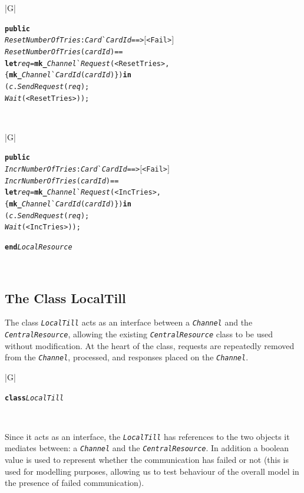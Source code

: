 \documentclass[\pformat,12pt,twoside]{article}
\newenvironment{VDMgray}%
{\begin{tabular}{|G|}\hline\small\begin{alltt}}%
{\end{alltt}\normalsize\\
 \hline\end{tabular}}
\begin{document}
\begin{VDMgray}
 \textbf{public}
 \textit{ResetNumberOfTries} : \textit{Card}\`{}\textit{CardId} ==\texttt{>} \ensuremath{[}\texttt{<}Fail\texttt{>}\ensuremath{]}
 \textit{ResetNumberOfTries}(\textit{cardId}) ==
   \textbf{let} \textit{req} = \textbf{mk\_}\textit{Channel}\`{}\textit{Request}(\texttt{<}ResetTries\texttt{>},
              \{\textbf{mk\_}\textit{Channel}\`{}\textit{CardId}(\textit{cardId})\}) \textbf{in}
     (\textit{c}.\textit{SendRequest}(\textit{req});
      \textit{Wait}(\texttt{<}ResetTries\texttt{>}));
\end{VDMgray}

\begin{VDMgray}
 \textbf{public}
 \textit{IncrNumberOfTries} : \textit{Card}\`{}\textit{CardId} ==\texttt{>} \ensuremath{[}\texttt{<}Fail\texttt{>}\ensuremath{]}
 \textit{IncrNumberOfTries}(\textit{cardId}) ==
   \textbf{let} \textit{req} = \textbf{mk\_}\textit{Channel}\`{}\textit{Request}(\texttt{<}IncTries\texttt{>},
                        \{\textbf{mk\_}\textit{Channel}\`{}\textit{CardId}(\textit{cardId})\}) \textbf{in}
     (\textit{c}.\textit{SendRequest}(\textit{req});
      \textit{Wait}(\texttt{<}IncTries\texttt{>}));

\textbf{end} \textit{LocalResource}
\end{VDMgray}


\subsection{The Class LocalTill}

The class \texttt{\emph{LocalTill}} acts as an interface between a
\texttt{\emph{Channel}} and the \texttt{\emph{CentralResource}},
allowing the existing \texttt{\emph{CentralResource}} class to be used
without modification. At the heart of the class, requests are
repeatedly removed from the \texttt{\emph{Channel}}, processed, and
responses placed on the \texttt{\emph{Channel}}.

\begin{VDMgray}
\textbf{class} \textit{LocalTill}
\end{VDMgray}


Since it acts as an interface, the \texttt{\emph{LocalTill}} has
references to the two objects it mediates between: a
\texttt{\emph{Channel}} and the \texttt{\emph{CentralResource}}.  In
addition a boolean value is used to represent whether the
communication has failed or not (this is used for modelling purposes,
allowing us to test behaviour of the overall model in the presence of
failed communication).
\end{document}
